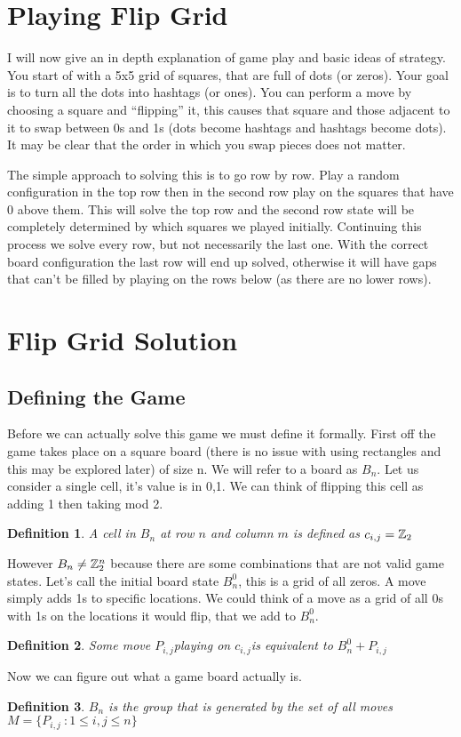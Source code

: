 \documentclass{article}
\newcommand{\mv}{\ensuremath{P_{i,j}}\:}
\newcommand{\cl}{\ensuremath{c_{i,j}}\:}
\newtheorem{definition}{Definition}[subsection]
\begin{document}
  \section{Playing Flip Grid}
  I will now give an in depth explanation of game play and basic ideas of strategy. You start of with a 5x5 grid of squares, that are full of dots (or zeros). Your goal is to turn all the dots into hashtags (or ones). You can perform a move by choosing a square and ``flipping'' it, this causes that square and those adjacent to it to swap between 0s and 1s (dots become hashtags and hashtags become dots). It may be clear that the order in which you swap pieces does not matter.\par
  The simple approach to solving this is to go row by row. Play a random configuration in the top row then in the second row play on the squares that have 0 above them. This will solve the top row and the second row state will be completely determined by which squares we played initially. Continuing this process we solve every row, but not necessarily the last one. With the correct board configuration the last row will end up solved, otherwise it will have gaps that can't be filled by playing on the rows below (as there are no lower rows).

  \section{Flip Grid Solution}
  \subsection{Defining the Game}
  Before we can actually solve this game we must define it formally. First off the game takes place on a square board (there is no issue with using rectangles and this may be explored later) of size n. We will refer to a board as $B_n$. Let us  consider a single cell, it's value is in {0,1}. We can think of flipping this cell as adding 1 then taking mod 2.
  \begin{definition}
    A cell in $B_n$ at row $n$ and column $m$ is defined as $c_{i,j}=\mathbb{Z}_2$
  \end{definition}\par
  However $B_n\neq\mathbb{Z}_2^n$ because there are some combinations that are not valid game states. Let's call the initial board state $B^0_n$, this is a grid of all zeros. A move simply adds 1s to specific locations. We could think of a move as a grid of all 0s with 1s on the locations it would flip, that we add to $B^0_n$.
  \begin{definition}
    Some move \mv playing on \cl is equivalent to $B^0_n+\mv$
  \end{definition}
  Now we can figure out what a game board actually is.
  \begin{definition}
    $B_n$ is the group that is generated by the set of all moves $M=\{\mv: 1\leq i,j\leq n\}$
  \end{definition}
\end{document}
